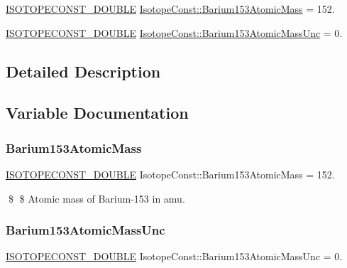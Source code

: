 \begin{DoxyCompactItemize}
\item 
\mbox{\hyperlink{group___isotope_const-_macros_ga8f45a7272ce02c0b4c65c44636ed719a}{I\+S\+O\+T\+O\+P\+E\+C\+O\+N\+S\+T\+\_\+\+D\+O\+U\+B\+LE}} \mbox{\hyperlink{group___isotope_const-_barium-_ba153_gacfb75c0f61b640061952f2467703ca25}{Isotope\+Const\+::\+Barium153\+Atomic\+Mass}} = 152.
\item 
\mbox{\hyperlink{group___isotope_const-_macros_ga8f45a7272ce02c0b4c65c44636ed719a}{I\+S\+O\+T\+O\+P\+E\+C\+O\+N\+S\+T\+\_\+\+D\+O\+U\+B\+LE}} \mbox{\hyperlink{group___isotope_const-_barium-_ba153_ga5b8d8fde63920c33dfef40e90bc4e2ba}{Isotope\+Const\+::\+Barium153\+Atomic\+Mass\+Unc}} = 0.
\end{DoxyCompactItemize}


\subsection{Detailed Description}


\subsection{Variable Documentation}
\mbox{\label{group___isotope_const-_barium-_ba153_gacfb75c0f61b640061952f2467703ca25}} 
\subsubsection{\texorpdfstring{Barium153\+Atomic\+Mass}{Barium153AtomicMass}}
{\footnotesize\ttfamily \mbox{\hyperlink{group___isotope_const-_macros_ga8f45a7272ce02c0b4c65c44636ed719a}{I\+S\+O\+T\+O\+P\+E\+C\+O\+N\+S\+T\+\_\+\+D\+O\+U\+B\+LE}} Isotope\+Const\+::\+Barium153\+Atomic\+Mass = 152.}

\$ \$ Atomic mass of Barium-\/153 in amu. \mbox{\label{group___isotope_const-_barium-_ba153_ga5b8d8fde63920c33dfef40e90bc4e2ba}} 
\subsubsection{\texorpdfstring{Barium153\+Atomic\+Mass\+Unc}{Barium153AtomicMassUnc}}
{\footnotesize\ttfamily \mbox{\hyperlink{group___isotope_const-_macros_ga8f45a7272ce02c0b4c65c44636ed719a}{I\+S\+O\+T\+O\+P\+E\+C\+O\+N\+S\+T\+\_\+\+D\+O\+U\+B\+LE}} Isotope\+Const\+::\+Barium153\+Atomic\+Mass\+Unc = 0.}

